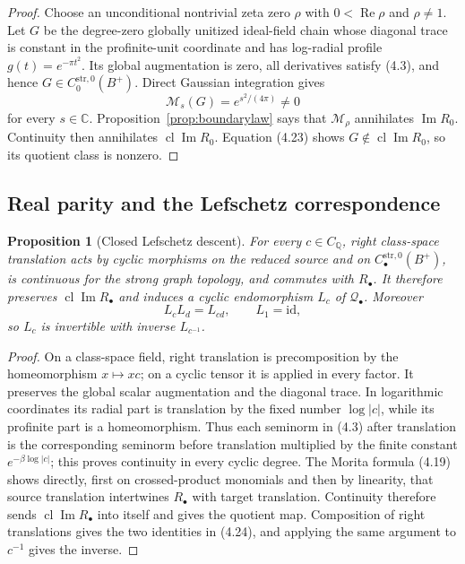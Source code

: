 \documentclass[11pt,reqno]{amsart}
\newtheorem{proposition}[theorem]{Proposition}
\newcommand{\C}{\mathbb C}
\newcommand{\Q}{\mathbb Q}
\newcommand{\im}{\operatorname{Im}}
\newcommand{\re}{\operatorname{Re}}
\newcommand{\clos}{\operatorname{cl}}
\newcommand{\id}{\mathrm{id}}
\begin{document}
\begin{proof}
Choose an unconditional nontrivial zeta zero $\rho$ with $0<\re\rho$ and $\rho\ne1$.  Let $G$ be
the degree-zero globally unitized ideal-field chain whose diagonal trace is constant in the
profinite-unit coordinate and has log-radial profile $g(t)=e^{-\pi t^2}$.  Its global
augmentation is zero, all derivatives satisfy (4.3), and hence
$G\in C_0^{\mathrm{str},0}(B^+)$.  Direct Gaussian integration gives
\[
                      \mathcal M_s(G)=e^{s^2/(4\pi)}\ne0            \tag{4.23}
\]
for every $s\in\C$.  Proposition~\ref{prop:boundarylaw} says that $\mathcal M_\rho$ annihilates
$\im R_0$.  Continuity then annihilates $\clos\im R_0$.  Equation (4.23) shows
$G\notin\clos\im R_0$, so its quotient class is nonzero.
\end{proof}

\subsection{Real parity and the Lefschetz correspondence}

\begin{proposition}[Closed Lefschetz descent]\label{prop:descent}
For every $c\in C_\Q$, right class-space translation acts by cyclic morphisms on the reduced
source and on $C_\bullet^{\mathrm{str},0}(B^+)$, is continuous for the strong graph topology, and
commutes with $R_\bullet$.  It therefore preserves $\clos\im R_\bullet$ and induces a cyclic
endomorphism $L_c$ of $\mathcal Q_\bullet$.  Moreover
\[
                        L_cL_d=L_{cd},\qquad L_1=\id,              \tag{4.24}
\]
so $L_c$ is invertible with inverse $L_{c^{-1}}$.
\end{proposition}

\begin{proof}
On a class-space field, right translation is precomposition by the homeomorphism $x\mapsto xc$;
on a cyclic tensor it is applied in every factor.  It preserves the global scalar augmentation
and the diagonal trace.  In logarithmic coordinates its radial part is translation by the fixed
number $\log|c|$, while its profinite part is a homeomorphism.  Thus each seminorm in (4.3) after
translation is the corresponding seminorm before translation multiplied by the finite constant
$e^{-\beta\log|c|}$; this proves continuity in every cyclic degree.  The Morita formula (4.19)
shows directly, first on crossed-product monomials and then by linearity, that source translation
intertwines $R_\bullet$ with target translation.  Continuity therefore sends
$\clos\im R_\bullet$ into itself and gives the quotient map.  Composition of right translations
gives the two identities in (4.24), and applying the same argument to $c^{-1}$ gives the inverse.
\end{proof}
\end{document}
